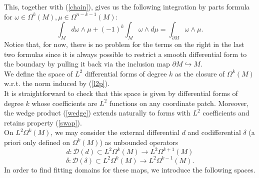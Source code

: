\documentclass{ifacconf}
\newcommand{\drh}[2]{\Omega^{#2}(#1)}
\begin{document}
This, together with (\ref{chain}), gives us the following integration by parts formula for $\omega\in\drh{M}{k},\mu\in\drh{M}{n-k-1}$:
\begin{equation}\label{intPart}
    \int_M d\omega\wedge\mu+(-1)^k\int_M\omega\wedge d\mu =\int_{\partial M} \omega\wedge\mu.
\end{equation}
Notice that, for now, there is no problem for the terms on the right in the last two formulas since it is always possible to restrict a smooth differential form to the boundary by pulling it back via the inclusion map $\partial M\hookrightarrow M$.\\
We define the space of $L^2$ differential forms of degree $k$ as the closure of $\drh{M}{k}$ w.r.t. the norm induced by (\ref{l2p}).\\
It is straightforward to check that this space is given by differential forms of degree $k$ whose coefficients are $L^2$ functions on any coordinate patch. Moreover, the wedge product (\ref{wedge}) extends naturally to forms with $L^2$ coefficients and retains property (\ref{swap}).\\
On $L^2\drh{M}{k}$, we may consider the external differential $d$ and codifferential $\delta$ (a priori only defined on $\drh{M}{k}$) as unbounded operators
\begin{equation}\label{ExtDiff}
    d\colon \mathcal{D}(d)\subset L^2\drh{M}{k}\to L^2\drh{M}{k+1}
\end{equation}
\begin{equation}\label{CoDiff}
    \delta\colon \mathcal{D}(\delta)\subset L^2\drh{M}{k}\to L^2\drh{M}{k-1}.
\end{equation}
In order to find fitting domains for these maps, we introduce the following spaces.
\end{document}
